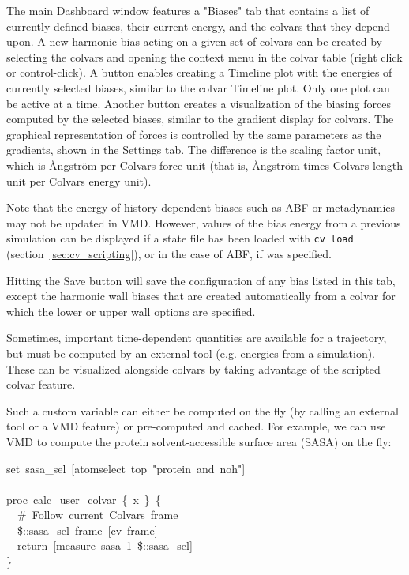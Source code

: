 {The main Dashboard window features a "Biases" tab that contains a list of currently defined biases, their current energy, and the colvars that they depend upon.
A new harmonic bias acting on a given set of colvars can be created by selecting the colvars and opening the context menu in the colvar table (right click or control-click).
A button enables creating a Timeline plot with the energies of currently selected biases, similar to the colvar Timeline plot.
Only one plot can be active at a time.
Another button creates a visualization of the biasing forces computed by the selected biases, similar to the gradient display for colvars.
The graphical representation of forces is controlled by the same parameters as the gradients, shown in the Settings tab.
The difference is the scaling factor unit, which is \AA{}ngstr\"om per Colvars force unit (that is, \AA{}ngstr\"om times Colvars length unit per Colvars energy unit).

Note that the energy of history-dependent biases such as ABF or metadynamics may not be updated in VMD.
However, values of the bias energy from a previous simulation can be displayed if a state file has been loaded with \texttt{cv load} (section~\ref{sec:cv_scripting}), or in the case of ABF, if  was specified.

Hitting the Save button will save the configuration of any bias listed in this tab, except the harmonic wall biases that are created automatically from a colvar for which the lower or upper wall options are specified.




Sometimes, important time-dependent quantities are available for a trajectory, but must be computed by an external tool (e.g. energies from a simulation).
These can be visualized alongside colvars by taking advantage of the scripted colvar feature.

Such a custom variable can either be computed on the fly (by calling an external tool or a VMD feature) or pre-computed and cached.
For example, we can use VMD to compute the protein solvent-accessible surface area (SASA) on the fly:

\begin{mdexampleinput}
\-set~sasa\_sel~[atomselect~top~"protein~and~noh"]\\
\-\\
\-proc~calc\_user\_colvar~\{~x~\}~\{\\
\-~~\#~Follow~current~Colvars~frame\\
\-~~\$::sasa\_sel~frame~[cv~frame]\\
\-~~return~[measure~sasa~1~\$::sasa\_sel]\\
\-\}
\end{mdexampleinput}

}
